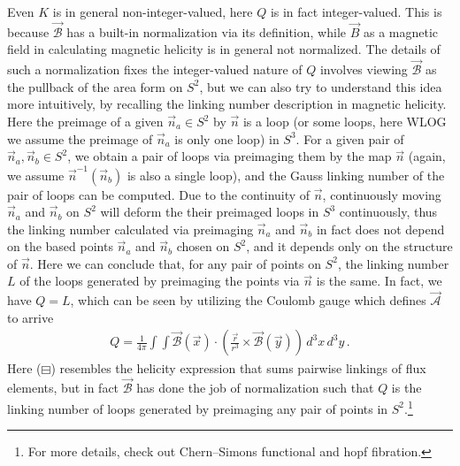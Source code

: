 \documentclass[11pt, onesided]{book}
\theoremstyle{break}
\theoremstyle{break}
\begin{document}
Even $K$ is in general non-integer-valued, here $Q$ is in fact integer-valued. This is because $\vec{\mathcal{B}}$ has a built-in normalization via its definition, while $\vec{B}$ as a magnetic field in calculating magnetic helicity is in general not normalized. The details of such a normalization fixes the integer-valued nature of $Q$ involves viewing $\mathcal{\vec{B}}$ as the pullback of the area form on $S^2$, but we can also try to understand this idea more intuitively, by recalling the linking number description in magnetic helicity. Here the preimage of a given $\vec{n}_a \in S^2$ by $\vec{n}$ is a loop (or some loops, here WLOG we assume the preimage of $\vec{n}_a$ is only one loop) in $S^3$. For a given pair of $\vec{n}_a, \vec{n}_b \in S^2$, we obtain a pair of loops via preimaging them by the map $\vec{n}$ (again, we assume $\vec{n}^{-1}(\vec{n}_b)$ is also a single loop), and the Gauss linking number of the pair of loops can be computed. Due to the continuity of $\vec{n}$, continuously moving $\vec{n}_a$ and $\vec{n}_b$ on $S^2$ will deform the their preimaged loops in $S^3$ continuously, thus the linking number calculated via preimaging $\vec{n}_a$ and $\vec{n}_b$ in fact does not depend on the based points $\vec{n}_a$ and $\vec{n}_b$ chosen on $S^2$, and it depends only on the structure of $\vec{n}$. Here we can conclude that, for any pair of points on $S^2$, the linking number $L$ of the loops generated by preimaging the points via $\vec{n}$ is the same. In fact, we have $Q = L$, which can be seen by utilizing the Coulomb gauge which defines $\vec{\mathcal{A}}$ to arrive
\begin{align*}
Q = \frac{1}{4\pi}\int \int \vec{\mathcal{B}}(\vec{x}) \cdot \left( \frac{\vec{r}}{r^3} \times\vec{\mathcal{B}}(\vec{y})\right) \, d^3x \, d^3y\,.\tag{$\boxminus$}
\end{align*}
Here ($\boxminus$) resembles the helicity expression that sums pairwise linkings of flux elements, but in fact $\mathcal{\vec{B}}$ has done the job of normalization such that $Q $ is the linking number of loops generated by preimaging any pair of points in $S^2$.\footnote{For more details, check out Chern–Simons functional and hopf fibration.}\\
\end{document}

